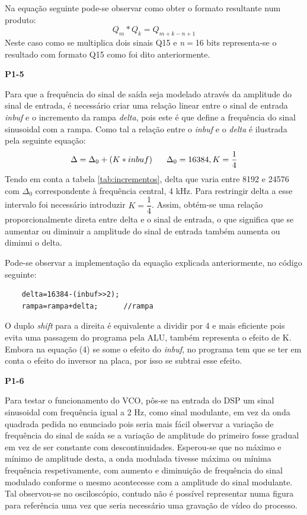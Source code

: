 \documentclass[11pt]{article}
\begin{document}
Na equação seguinte pode-se observar como obter o formato resultante num produto:
\begin{equation}
Q_{m} * Q_{k}=Q_{m+k-n+1}
\end{equation}
Neste caso como se multiplica dois sinais Q15 e \textit{n}$=$16 bits representa-se o resultado com formato Q15 como foi dito anteriormente. 
\vspace{2 mm}

\textbf{P1-5}
\label{para:P1-5}

Para que a frequência do sinal de saída seja modelado através da amplitude do sinal de entrada, é necessário criar uma relação linear entre o sinal de entrada \textit{inbuf} e o incremento da rampa \textit{delta}, pois este é que define a frequência do sinal sinusoidal com a rampa. Como tal a relação entre o \textit{inbuf} e o \textit{delta} é ilustrada pela seguinte equação:
\begin{equation}
	\Delta=\Delta_0+(K*inbuf)	\hspace{6 mm}\Delta_0=16384, K=\frac{1}{4}
\end{equation}
Tendo em conta a tabela \ref{tab:incrementos}, delta que varia entre 8192 e 24576 com $\Delta_0$ correspondente à frequência central, 4 kHz. Para restringir delta a esse intervalo foi necessário introduzir $K=\dfrac{1}{4}$. Assim, obtém-se uma relação proporcionalmente direta entre delta e o sinal de entrada, o que significa que se aumentar ou diminuir a amplitude do sinal de entrada também aumenta ou diminui o delta.

Pode-se observar a implementação da equação explicada anteriormente, no código seguinte:

\begin{lstlisting}
	delta=16384-(inbuf>>2); 
	rampa=rampa+delta;		//rampa
\end{lstlisting}
O duplo \textit{shift} para a direita é equivalente a dividir por 4 e mais eficiente pois evita uma passagem do programa pela ALU, também representa o efeito de K.
Embora na equação (4) se some o efeito do \textit{inbuf}, no programa tem que se ter em conta o efeito do inversor na placa, por isso se subtrai esse efeito.
\vspace{2 mm}

\textbf{P1-6}
\label{para:P1-6}

Para testar o funcionamento do VCO, pôs-se na entrada do DSP um sinal sinusoidal com frequência igual a 2 Hz, como sinal modulante, em vez da onda quadrada pedida no enunciado pois seria mais fácil observar a variação de frequência do sinal de saída se a variação de amplitude do primeiro fosse gradual em vez de ser constante com descontinuidades. Esperou-se que no máximo e mínimo de amplitude desta, a onda modulada tivesse máxima ou mínima frequência respetivamente, com aumento e diminuição de frequência do sinal modulado conforme o mesmo acontecesse com a amplitude do sinal modulante. Tal observou-se no osciloscópio, contudo não é possível representar numa figura para referência uma vez que seria necessário uma gravação de vídeo do processo.
\end{document}
